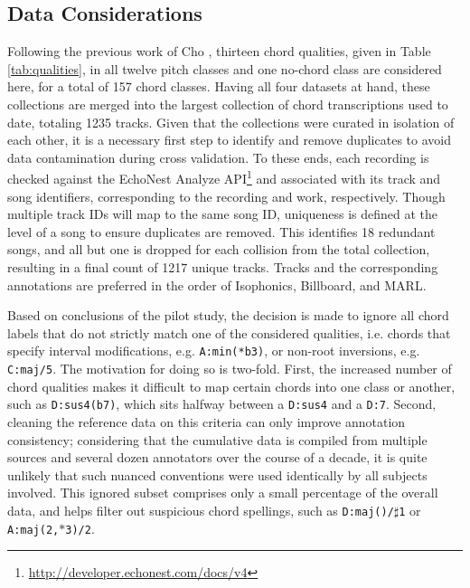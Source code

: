 \subsection{Data Considerations}
\label{subsec:data_considerations}
Following the previous work of Cho \cite{Cho2014Improved}, thirteen chord qualities, given in Table \ref{tab:qualities}, in all twelve pitch classes and one no-chord class are considered here, for a total of 157 chord classes.
Having all four datasets at hand, these collections are merged into the largest collection of chord transcriptions used to date, totaling 1235 tracks.
Given that the collections were curated in isolation of each other, it is a necessary first step to identify and remove duplicates to avoid data contamination during cross validation.
To these ends, each recording is checked against the EchoNest Analyze API\footnote{\url{http://developer.echonest.com/docs/v4}} and associated with its track and song identifiers, corresponding to the recording and work, respectively.
Though multiple track IDs will map to the same song ID, uniqueness is defined at the level of a song to ensure duplicates are removed.
This identifies 18 redundant songs, and all but one is dropped for each collision from the total collection, resulting in a final count of 1217 unique tracks.
Tracks and the corresponding annotations are preferred in the order of Isophonics, Billboard, and MARL.

Based on conclusions of the pilot study, the decision is made to ignore all chord labels that do not strictly match one of the considered qualities, i.e. chords that specify interval modifications, e.g. \texttt{A:min(*b3)}, or non-root inversions, e.g. \texttt{C:maj/5}.
The motivation for doing so is two-fold.
First, the increased number of chord qualities makes it difficult to map certain chords into one class or another, such as \texttt{D:sus4(b7)}, which sits halfway between a \texttt{D:sus4} and a \texttt{D:7}.
Second, cleaning the reference data on this criteria can only improve annotation consistency; considering that the cumulative data is compiled from multiple sources and several dozen annotators over the course of a decade, it is quite unlikely that such nuanced conventions were used identically by all subjects involved.
This ignored subset comprises only a small percentage of the overall data, and helps filter out suspicious chord spellings, such as \texttt{D:maj()/$\sharp$1} or \texttt{A:maj(2,$\ast$3)/2}.

